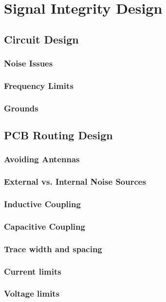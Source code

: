 
\chapter{Signal Integrity Design}

\section{Circuit Design}
\subsection{Noise Issues}
\subsection{Frequency Limits}
\subsection{Grounds}

\section{PCB Routing Design}
\subsection{Avoiding Antennas}
\subsection{External vs. Internal Noise Sources}
\subsection{Inductive Coupling}
\subsection{Capacitive Coupling}
\subsection{Trace width and spacing}
\subsection{Current limits}
\subsection{Voltage limits}
